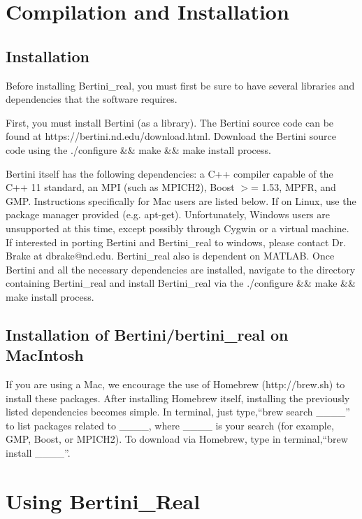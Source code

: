 \documentclass[10pt]{article}
\begin{document}
\section{Compilation and Installation}
\subsection{Installation}
Before installing Bertini\_real, you must first be sure to have several libraries and dependencies that the software requires. \par
First, you must install Bertini (as a library).  The Bertini source code can be found \newline at https://bertini.nd.edu/download.html. Download the Bertini source code using the ./configure \&\& make \&\& make install process. \par
Bertini itself has the following dependencies: a C++ compiler capable of the C++ 11 standard, an MPI (such as MPICH2), Boost $>$= 1.53, MPFR, and GMP. Instructions specifically for Mac users are listed below. If on Linux, use the package manager provided (e.g. apt-get). Unfortunately, Windows users are unsupported at this time, except possibly through Cygwin or a virtual machine. If interested in porting Bertini and Bertini\_real to windows, please contact Dr. Brake at dbrake@nd.edu. Bertini\_real also is dependent on MATLAB. Once Bertini and all the necessary dependencies are installed, navigate to the directory containing Bertini\_real and install Bertini\_real via the ./configure \&\& make \&\& make install process. \par
\subsection{Installation of Bertini/bertini\_real on MacIntosh}

\indent If you are using a Mac, we encourage the use of Homebrew (http://brew.sh) to install these packages. After installing Homebrew itself, installing the previously listed dependencies becomes simple. In terminal, just type,``brew search \_\_\_\_'' to list packages related to \_\_\_\_, where \_\_\_\_ is your search (for example, GMP, Boost, or MPICH2). To download via Homebrew, type in terminal,``brew install \_\_\_\_''.


\clearpage
\section{Using Bertini\_Real}
\label{sec:running}
\end{document}
